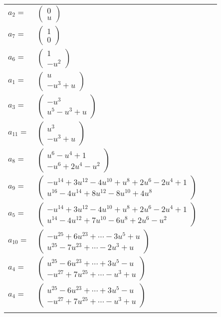 \documentclass[1p]{elsarticle_modified}
\theoremstyle{definition}
\begin{document}
\begin{tabular}{m{7pt} m{180pt} m{7pt} m{180pt} }
\flushright $a_{2}=$&$\begin{pmatrix}0\\u\end{pmatrix}$ \\
\flushright $a_{7}=$&$\begin{pmatrix}1\\0\end{pmatrix}$ \\
\flushright $a_{6}=$&$\begin{pmatrix}1\\- u^2\end{pmatrix}$ \\
\flushright $a_{1}=$&$\begin{pmatrix}u\\- u^3+u\end{pmatrix}$ \\
\flushright $a_{3}=$&$\begin{pmatrix}- u^3\\u^5- u^3+u\end{pmatrix}$ \\
\flushright $a_{11}=$&$\begin{pmatrix}u^3\\- u^3+u\end{pmatrix}$ \\
\flushright $a_{8}=$&$\begin{pmatrix}u^6- u^4+1\\- u^6+2 u^4- u^2\end{pmatrix}$ \\
\flushright $a_{9}=$&$\begin{pmatrix}- u^{14}+3 u^{12}-4 u^{10}+u^8+2 u^6-2 u^4+1\\u^{16}-4 u^{14}+8 u^{12}-8 u^{10}+4 u^8\end{pmatrix}$ \\
\flushright $a_{5}=$&$\begin{pmatrix}- u^{14}+3 u^{12}-4 u^{10}+u^8+2 u^6-2 u^4+1\\u^{14}-4 u^{12}+7 u^{10}-6 u^8+2 u^6- u^2\end{pmatrix}$ \\
\flushright $a_{10}=$&$\begin{pmatrix}- u^{25}+6 u^{23}+\cdots-3 u^5+u\\u^{25}-7 u^{23}+\cdots-2 u^3+u\end{pmatrix}$ \\
\flushright $a_{4}=$&$\begin{pmatrix}u^{25}-6 u^{23}+\cdots+3 u^5- u\\- u^{27}+7 u^{25}+\cdots- u^3+u\end{pmatrix}$\\ \flushright $a_{4}=$&$\begin{pmatrix}u^{25}-6 u^{23}+\cdots+3 u^5- u\\- u^{27}+7 u^{25}+\cdots- u^3+u\end{pmatrix}$\\&\end{tabular}
\end{document}
